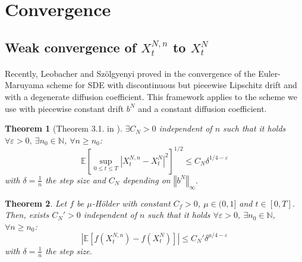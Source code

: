 \documentclass[12pt]{article}
\newtheorem{theo}{Theorem}
\newcommand{\norme}[1]{\left\Vert #1\right\Vert}
\newcommand{\N}{\mathbb{N}}
\newcommand{\E}{\mathbb{E}}
\begin{document}

\newpage
\section{Convergence} 
    
    \subsection{Weak convergence of $X_t^{N,n}$ to $X_t^N$}
            \paragraph{}
            Recently, Leobacher and Szölgyenyi proved in \cite{Leo-Szo} the convergence of the Euler-Maruyama scheme for SDE with discontinuous but piecewise Lipschitz drift and with a degenerate diffusion coefficient. This framework applies to the scheme we use with piecewise constant drift $b^N$ and a constant diffusion coefficient.
    
       \begin{theo}[Theorem 3.1. in \cite{Leo-Szo}]\label{leo}
           $\exists C_N>0$ independent of $n$ such that it holds  $\forall \varepsilon >0,\ \exists n_0\in\N$, $\forall n\geq n_0$:
           \begin{equation}
            \E\left[\underset{0\leq t\leq T}{\sup}\left|X^{N,n}_t-X^N_t\right|^2\right]^{1/2}\leq C_N\delta^{1/4-\varepsilon}
            \end{equation}
            with $\delta=\frac{1}{n}$ the step size and $C_N$ depending on $\norme{b^N}_\infty$.
        \end{theo}
    
        \begin{theo}
            Let $f$ be $\mu$-Hölder with constant $C_f>0$, $\mu\in(0,1]$ and $t\in[0,T]$. Then, exists $C_N'>0$ independent of $n$ such that it holds  $\forall \varepsilon >0,\ \exists n_0\in\N$, $\forall n\geq n_0$:
            \begin{equation}
            \left|\E\left[f\left(X_t^{N,n}\right)-f\left(X_t^N\right)\right]\right| \leq C_N'\delta^{\mu/4-\varepsilon}
            \end{equation}                       
            with $\delta=\frac{1}{n}$ the step size.
        \end{theo}
    
\end{document}
